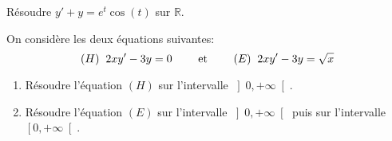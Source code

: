 \documentclass[a4paper,10pt]{report}
\begin{document}
\begin{Exa} Résoudre $y'+y = e^t \cos(t)$ sur $\mathbb{R}$.
\end{Exa}


\begin{Exa} On considère les deux équations suivantes:\\
$$ (H) \; \;  2xy'-3y=0  \qquad \hbox{ et } \qquad (E) \; \; 2xy'-3y=\sqrt{x} $$

\begin{enumerate}
\item Résoudre l'équation $(H)$ sur l'intervalle $\left]  0,+\infty\right[ $.
\item Résoudre l'équation $(E)$ sur l'intervalle $\left]  0,+\infty\right[   $ puis sur l'intervalle $\left[ 0,+\infty\right[ $.
\end{enumerate}
\end{Exa}
\end{document}
